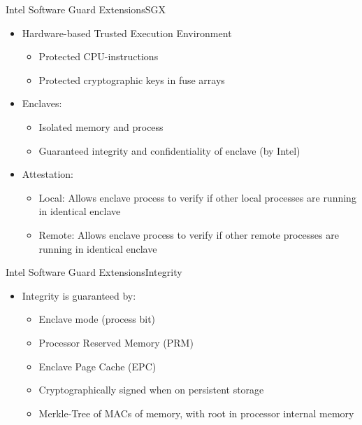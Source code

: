 \documentclass{beamer}
\begin{document}
\begin{frame}{Intel Software Guard Extensions}{SGX}%
	\begin{itemize}
		\item Hardware-based Trusted Execution Environment
		\begin{itemize}
			\item Protected CPU-instructions
			\item Protected cryptographic keys in fuse arrays
		\end{itemize}

		\vfill

		\item Enclaves:
		\begin{itemize}
			\item Isolated memory and process
			\item Guaranteed integrity and confidentiality of enclave (by Intel)
		\end{itemize}

		\vfill

		\item Attestation:
			\begin{itemize}
				\item Local: Allows enclave process to verify if other local processes are running in identical enclave
				\item Remote: Allows enclave process to verify if other remote processes are running in identical enclave
			\end{itemize}
	\end{itemize}
\end{frame}

\begin{frame}{Intel Software Guard Extensions}{Integrity}
    \begin{itemize}
    	\item Integrity is guaranteed by:

			\vfill

    	\begin{itemize}
    		\item Enclave mode (process bit) %

  			\vfill

    		\item Processor Reserved Memory (PRM)

  			\vfill

    		\item Enclave Page Cache (EPC)

  			\vfill

    		\item Cryptographically signed when on persistent storage

  			\vfill

    		\item Merkle-Tree of MACs of memory, with root in processor internal memory
    	\end{itemize}
    \end{itemize}
\end{frame}
\end{document}
